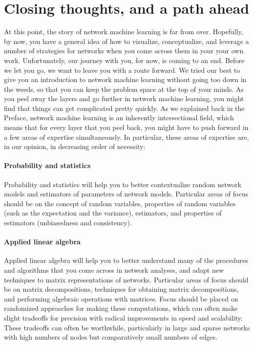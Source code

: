 \section{Closing thoughts, and a path ahead}
\label{sec:ch10:next}

At this point, the story of network machine learning is far from over. Hopefully, by now, you have a general idea of how to visualize, conceptualize, and leverage a number of strategies for networks when you come across them in your your own work. Unfortunately, our journey with you, for now, is coming to an end. Before we let you go, we want to leave you with a route forward. We tried our best to give you an introduction to network machine learning without going too down in the weeds, so that you can keep the problem space at the top of your minds. As you peel away the layers and go further in network machine learning, you might find that things can get complicated pretty quickly. As we explained back in the Preface, network machine learning is an inherently intersectional field, which means that for every layer that you peel back, you might have to push forward in a few areas of expertise simultaneously. In particular, these areas of expertise are, in our opinion, in decreasing order of necessity:

\paragraph{Probability and statistics}
Probability and statistics will help you to better contextualize random network models and estimators of parameters of network models. Particular areas of focus should be on the concept of random variables, properties of random variables (such as the expectation and the variance), estimators, and properties of estimators (unbiasedness and consistency). 

\paragraph{Applied linear algebra}
Applied linear algebra will help you to better understand many of the procedures and algorithms that you come across in network analyses, and adapt new techniques to matrix representations of networks. Particular areas of focus should be on matrix decompositions, techniques for obtaining matrix decompositions, and performing algebraic operations with matrices. Focus should be placed on randomized approaches for making these computations, which can often make slight tradeoffs for precision with radical improvements in speed and scalability. These tradeoffs can often be worthwhile, particularly in large and sparse networks with high numbers of nodes but comparatively small numbers of edges.

